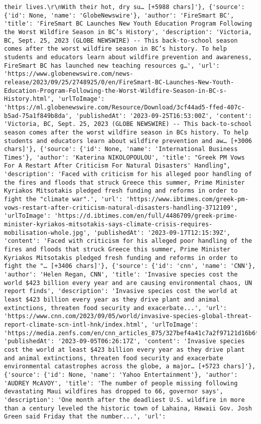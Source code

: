 \documentclass[
  letterpaper,
  DIV=11,
  numbers=noendperiod]{scrartcl}
\begin{document}
\begin{verbatim}
their lives.\r\nWith their hot, dry su… [+5988 chars]'}, {'source': {'id': None, 'name': 'GlobeNewswire'}, 'author': 'FireSmart BC', 'title': 'FireSmart BC Launches New Youth Education Program Following the Worst Wildfire Season in BC’s History', 'description': 'Victoria, BC, Sept. 25, 2023 (GLOBE NEWSWIRE) -- This back-to-school season comes after the worst wildfire season in BC’s history. To help students and educators learn about wildfire prevention and awareness, FireSmart BC has launched new teaching resources g…', 'url': 'https://www.globenewswire.com/news-release/2023/09/25/2748925/0/en/FireSmart-BC-Launches-New-Youth-Education-Program-Following-the-Worst-Wildfire-Season-in-BC-s-History.html', 'urlToImage': 'https://ml.globenewswire.com/Resource/Download/3cf44ad5-ffed-407c-b5ad-75a1f849b8da', 'publishedAt': '2023-09-25T16:53:00Z', 'content': 'Victoria, BC, Sept. 25, 2023 (GLOBE NEWSWIRE) -- This back-to-school season comes after the worst wildfire season in BCs history. To help students and educators learn about wildfire prevention and aw… [+3006 chars]'}, {'source': {'id': None, 'name': 'International Business Times'}, 'author': 'Katerina NIKOLOPOULOU', 'title': "Greek PM Vows For A Restart After Criticism For Natural Disasters' Handling", 'description': 'Faced with criticism for his alleged poor handling of the fires and floods that struck Greece this summer, Prime Minister Kyriakos Mitsotakis pledged fresh funding and reforms in order to fight the "climate war".', 'url': 'https://www.ibtimes.com/greek-pm-vows-restart-after-criticism-natural-disasters-handling-3712109', 'urlToImage': 'https://d.ibtimes.com/en/full/4486709/greek-prime-minister-kyriakos-mitsotakis-says-climate-crisis-requires-mobilisation-whole.jpg', 'publishedAt': '2023-09-17T12:15:39Z', 'content': 'Faced with criticism for his alleged poor handling of the fires and floods that struck Greece this summer, Prime Minister Kyriakos Mitsotakis pledged fresh funding and reforms in order to fight the "… [+3406 chars]'}, {'source': {'id': 'cnn', 'name': 'CNN'}, 'author': 'Helen Regan, CNN', 'title': 'Invasive species cost the world $423 billion every year and are causing environmental chaos, UN report finds', 'description': 'Invasive species cost the world at least $423 billion every year as they drive plant and animal extinctions, threaten food security and exacerbate...', 'url': 'https://www.cnn.com/2023/09/05/world/invasive-species-global-threat-report-climate-scn-intl-hnk/index.html', 'urlToImage': 'https://media.zenfs.com/en/cnn_articles_875/327bef4a41c7a2f97121d16b6fafb30b', 'publishedAt': '2023-09-05T06:26:17Z', 'content': 'Invasive species cost the world at least $423 billion every year as they drive plant and animal extinctions, threaten food security and exacerbate environmental catastrophes across the globe, a major… [+5723 chars]'}, {'source': {'id': None, 'name': 'Yahoo Entertainment'}, 'author': 'AUDREY McAVOY', 'title': 'The number of people missing following devastating Maui wildfires has dropped to 66, governor says', 'description': 'One month after the deadliest U.S. wildfire in more than a century leveled the historic town of Lahaina, Hawaii Gov. Josh Green said Friday that the number...', 'url': 
\end{verbatim}
\end{document}
